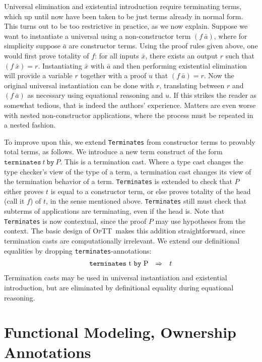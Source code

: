\documentclass[preprint,natbib]{sigplanconf}
\newcommand{\optt}{\textsc{OpTT}}
\newcommand{\To}{\Rightarrow}
\begin{document}
Universal elimination and existential introduction require terminating
terms, which up until now have been taken to be just terms already in
normal form.  This turns out to be too restrictive in practice, as we
now explain.  Suppose we want to instantiate a universal using a
non-constructor term $(f\ \bar{a})$, where for simplicity suppose
$\bar{a}$ are constructor terms.  Using the proof rules given above,
one would first prove totality of $f$: for all inputs $\bar{x}$, there
exists an output $r$ such that $(f\ \bar{x}) = r$.  Instantiating
$\bar{x}$ with $\bar{a}$ and then performing existential elimination
will provide a variable $r$ together with a proof $u$ that $(f\
\bar{a}) = r$.  Now the original universal instantiation can be done
with $r$, translating between $r$ and $(f\ \bar{a})$ as necessary
using equational reasoning and $u$.  If this strikes the reader as
somewhat tedious, that is indeed the authors' experience.  Matters are
even worse with nested non-constructor applications, where the process
must be repeated in a nested fashion.

To improve upon this, we extend \texttt{Terminates} from constructor
terms to provably total terms, as follows.  We introduce a new term
construct of the form $\texttt{terminates}\ t\ \texttt{by}\ P$.  This
is a termination cast.  Where a type cast changes the type checker's
view of the type of a term, a termination cast changes its view of the
termination behavior of a term.  \texttt{Terminates} is extended to
check that $P$ either proves $t$ is equal to a constructor term, or
else proves totality of the head (call it $f$) of $t$, in the sense
mentioned above.  \texttt{Terminates} still must check that subterms
of applications are terminating, even if the head is.  Note that
\texttt{Terminates} is now contextual, since the proof $P$ may use
hypotheses from the context. The basic design of \optt\ makes this
addition straightforward, since termination casts are computationally
irrelevant.  We extend our definitional equalities by dropping
\texttt{terminates}-annotations:
\[
\begin{array}{lll}
$\texttt{terminates}\ t\ \texttt{by}\ P$ & \To & t
\end{array}
\]
\noindent Termination casts may be used in universal instantiation and
existential introduction, but are eliminated by definitional equality
during equational reasoning.

\section{Functional Modeling, Ownership Annotations}
\label{sec:model}
\end{document}
